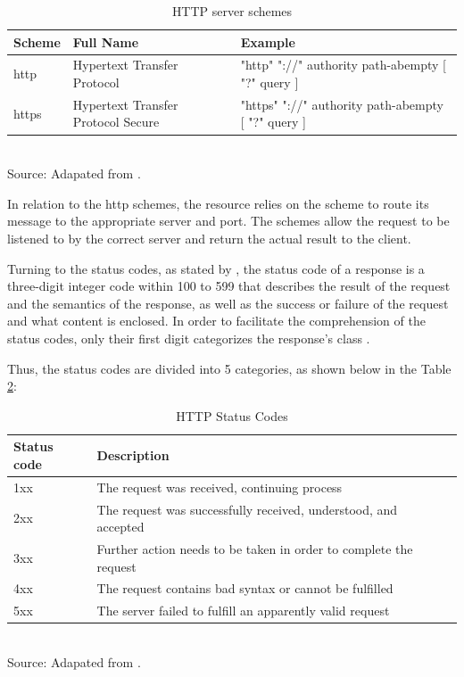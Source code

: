 \begin{table}[H]
\centering
\caption{HTTP server schemes}
\label{tab:http-server-schemes}
\begin{tabular}{lll}
\textbf{Scheme} & \textbf{Full Name} & \textbf{Example} \\ \hline
http & Hypertext Transfer Protocol & "http" "://" authority path-abempty {[} "?" query {]} \\ \hline
https & Hypertext Transfer Protocol  Secure & "https" "://" authority path-abempty {[} "?" query {]} \\ \hline
\end{tabular}
\\ \footnotesize Source: Adapated from \cite{rfc9110}.
\end{table}

In relation to the http schemes, the resource relies on the scheme to route its message to the appropriate server and port. The schemes allow the request to be listened to by the correct server and return the actual result to the client.

Turning to the status codes, as stated by \cite{rfc9110}, the status code of a response is a three-digit integer code within 100 to 599 that describes the result of the request and the semantics of the response, as well as the success or failure of the request and what content is enclosed. In order to facilitate the comprehension of the status codes, only their first digit 
categorizes the response's class \cite{rfc9110}.

Thus, the status codes are divided into 5 categories, as shown below in the Table \ref{tab:http-status-codes-simplified}:

\begin{table}[H]
\centering 
\caption{HTTP Status Codes}
\label{tab:http-status-codes-simplified}
\begin{tabular}{lll}
\textbf{Status code} & \textbf{Description} & \\ \hline
1xx & The request was received, continuing process & \\ \hline
2xx & The request was successfully received, understood, and accepted & \\ \hline
3xx & Further action needs to be taken in order to complete the request & \\ \hline
4xx & The request contains bad syntax or cannot be fulfilled & \\ \hline
5xx & The server failed to fulfill an apparently valid request & \\ \hline
\end{tabular}
\\ \footnotesize Source: Adapated from \cite{rfc9110}.
\end{table}

